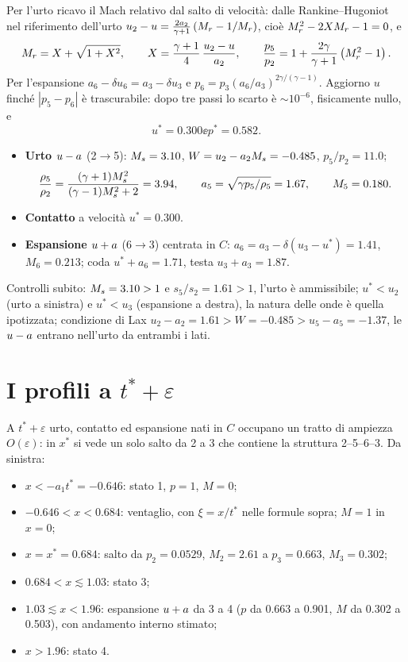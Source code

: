Per l'urto ricavo il Mach relativo dal salto di velocità: dalle Rankine--Hugoniot nel riferimento dell'urto
$u_2-u=\tfrac{2a_2}{\gamma+1}\left(M_{r}-1/M_{r}\right)$, cioè $M_{r}^2-2XM_{r}-1=0$, e
\[
M_{r}=X+\sqrt{1+X^2},\qquad X=\frac{\gamma+1}{4}\,\frac{u_2-u}{a_2},\qquad
\frac{p_5}{p_2}=1+\frac{2\gamma}{\gamma+1}\left(M_{r}^2-1\right).
\]
Per l'espansione $a_6-\delta u_6=a_3-\delta u_3$ e $p_6=p_3(a_6/a_3)^{2\gamma/(\gamma-1)}$. Aggiorno $u$ finché
$|p_5-p_6|$ è trascurabile: dopo tre passi lo scarto è $\sim10^{-6}$, fisicamente nullo, e
\[
u^*=\num{0.300}\ee p^*=\num{0.582}.
\]
\begin{itemize}
\item \textbf{Urto $u-a$} (2$\to$5): $M_{s}=\num{3.10}$, $W=u_2-a_2M_{s}=-\num{0.485}$, $p_5/p_2=\num{11.0}$;
  \[
  \frac{\rho_5}{\rho_2}=\frac{(\gamma+1)M_{s}^2}{(\gamma-1)M_{s}^2+2}=\num{3.94},\qquad
  a_5=\sqrt{\gamma p_5/\rho_5}=\num{1.67},\qquad M_5=\num{0.180}.
  \]
\item \textbf{Contatto} a velocità $u^*=\num{0.300}$.
\item \textbf{Espansione $u+a$} (6$\to$3) centrata in $C$: $a_6=a_3-\delta(u_3-u^*)=\num{1.41}$,
  $M_6=\num{0.213}$; coda $u^*+a_6=\num{1.71}$, testa $u_3+a_3=\num{1.87}$.
\end{itemize}
Controlli subito: $M_{s}=\num{3.10}>1$ e $s_5/s_2=\num{1.61}>1$, l'urto è ammissibile; $u^*<u_2$ (urto a sinistra) e
$u^*<u_3$ (espansione a destra), la natura delle onde è quella ipotizzata; condizione di Lax
$u_2-a_2=\num{1.61}>W=-\num{0.485}>u_5-a_5=-\num{1.37}$, le $u-a$ entrano nell'urto da entrambi i lati.

\section*{I profili a $t^*+\varepsilon$}
A $t^*+\varepsilon$ urto, contatto ed espansione nati in $C$ occupano un tratto di ampiezza $O(\varepsilon)$: in
$x^*$ si vede un solo salto da 2 a 3 che contiene la struttura 2--5--6--3. Da sinistra:
\begin{itemize}
\item $x<-a_1t^*=-\num{0.646}$: stato 1, $p=1$, $M=0$;
\item $-\num{0.646}<x<\num{0.684}$: ventaglio, con $\xi=x/t^*$ nelle formule sopra; $M=1$ in $x=0$;
\item $x=x^*=\num{0.684}$: salto da $p_2=\num{0.0529}$, $M_2=\num{2.61}$ a $p_3=\num{0.663}$, $M_3=\num{0.302}$;
\item $\num{0.684}<x\lesssim\num{1.03}$: stato 3;
\item $\num{1.03}\lesssim x<\num{1.96}$: espansione $u+a$ da 3 a 4 ($p$ da \num{0.663} a \num{0.901}, $M$ da
  \num{0.302} a \num{0.503}), con andamento interno stimato;
\item $x>\num{1.96}$: stato 4.
\end{itemize}


